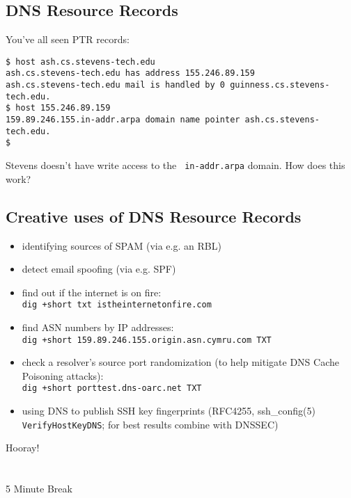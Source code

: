 \documentclass[xga]{xdvislides}
\begin{document}
\subsection{DNS Resource Records}
You've all seen PTR records:
\\

\begin{verbatim}
$ host ash.cs.stevens-tech.edu
ash.cs.stevens-tech.edu has address 155.246.89.159
ash.cs.stevens-tech.edu mail is handled by 0 guinness.cs.stevens-tech.edu.
$ host 155.246.89.159
159.89.246.155.in-addr.arpa domain name pointer ash.cs.stevens-tech.edu.
$ 
\end{verbatim}

Stevens doesn't have write access to the {\tt
in-addr.arpa} domain.  How does this work?
 
\subsection{Creative uses of DNS Resource Records}
\begin{itemize}
	\item identifying sources of SPAM (via e.g. an RBL)
	\item detect email spoofing (via e.g. SPF)
	\item find out if the internet is on fire: \\
		\verb|dig +short txt istheinternetonfire.com|
	\item find ASN numbers by IP addresses: \\
		\verb|dig +short 159.89.246.155.origin.asn.cymru.com TXT|
	\item check a resolver's source port randomization (to help
		mitigate DNS Cache Poisoning attacks): \\
		\verb|dig +short porttest.dns-oarc.net TXT|
	\item using DNS to publish SSH key fingerprints (RFC4255,
ssh\_config(5) \verb+VerifyHostKeyDNS+; for best results combine with DNSSEC)
\end{itemize}

\newpage
\vspace*{\fill}
\begin{center}
    \Hugesize
        Hooray! \\ [1em]
    \hspace*{5mm}
    \blueline\\
    \hspace*{5mm}\\
        5 Minute Break
\end{center}
\vspace*{\fill}
\end{document}
